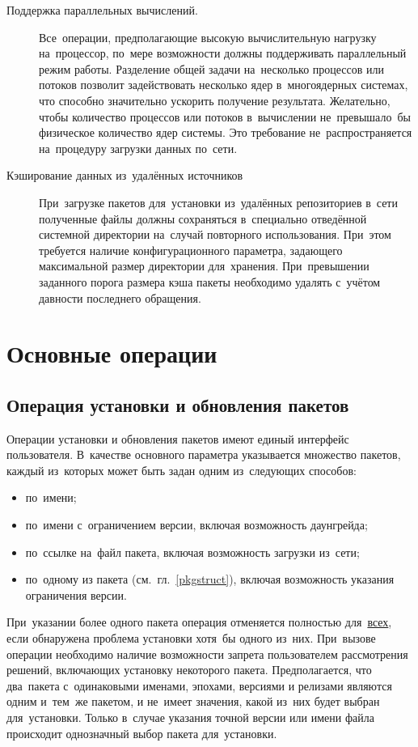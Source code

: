 \begin{description}
\item[Поддержка параллельных вычислений.]
Все~операции, предполагающие высокую вычислительную нагрузку на~процессор,
по~мере возможности должны поддерживать параллельный режим работы.
Разделение общей задачи на~несколько процессов или потоков позволит задействовать несколько ядер в~многоядерных системах,
что способно значительно ускорить получение результата. 
Желательно, чтобы количество процессов или потоков в~вычислении не~превышало~бы физическое количество ядер системы.
Это требование не~распространяется на~процедуру загрузки данных по~сети.

\item[Кэширование данных из~удалённых источников]
При~загрузке пакетов для~установки из~удалённых репозиториев в~сети
полученные файлы должны сохраняться в~специально отведённой системной директории на~случай повторного использования.
При~этом требуется наличие конфигурационного параметра, задающего максимальной размер директории для~хранения.
При~превышении заданного порога размера кэша пакеты необходимо удалять с~учётом давности последнего обращения.

\end{description}

\section{Основные операции}
\subsection{Операция установки и обновления пакетов}

Операции установки и обновления пакетов имеют единый интерфейс пользователя.
В~качестве основного параметра указывается множество пакетов, каждый из~которых может быть  задан одним из~следующих способов:

\begin{itemize}
\item {по~имени;}
\item {по~имени с~ограничением версии, включая возможность даунгрейда;}
\item {по~ссылке на~файл пакета, включая возможность загрузки из~сети;}
\item{по~одному из  пакета (см.~гл.~\ref{pkgstruct}), включая возможность указания ограничения версии.}
\end{itemize}

При~указании более одного пакета операция отменяется полностью для~\underline{всех}, 
если обнаружена проблема установки хотя~бы одного из~них.
При~вызове операции необходимо наличие возможности запрета пользователем рассмотрения решений, 
включающих установку некоторого пакета. 
Предполагается, что два~пакета с~одинаковыми именами, эпохами, версиями и релизами являются одним и~тем~же пакетом,
и не~имеет значения, какой из~них будет выбран для~установки.
Только в~случае указания точной версии или имени файла происходит однозначный выбор пакета для~установки.

